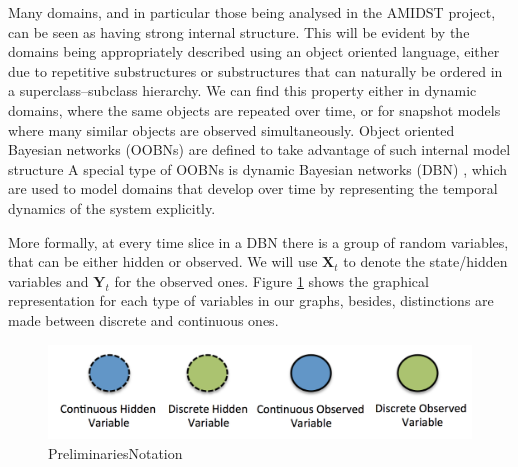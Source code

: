 Many domains, and in particular those being analysed in the AMIDST project, can be seen as having strong internal structure. This will be evident by the domains being appropriately described using an object oriented language, either due to repetitive substructures or substructures that can naturally be ordered in a superclass–subclass hierarchy. We can find this property either in dynamic domains, where the same objects are repeated over time, or for snapshot models where many similar objects are observed simultaneously. Object oriented Bayesian networks \cite{KollerPfeffer1997} (OOBNs) are defined to take advantage of such internal model structure A special type of OOBNs is dynamic Bayesian networks (DBN) \cite{DeanKanazawa1989}, which are used to model domains that develop over time by representing the temporal dynamics of the system explicitly. 


More formally, at every time slice in a DBN there is a group of random variables, that can be either hidden or observed. We will use $\bm X_t$ to denote the state/hidden variables and $\bm Y_t$ for the observed ones. Figure \ref{Figure:PreliminariesNotation} shows the graphical representation for each type of variables in our graphs, besides, distinctions are made between discrete and continuous ones. %

\begin{figure}
\begin{center}
\includegraphics[scale=0.4]{./figures/PreliminariesNotation}
\caption{\label{Figure:PreliminariesNotation}PreliminariesNotation
}
\end{center}
\end{figure}

